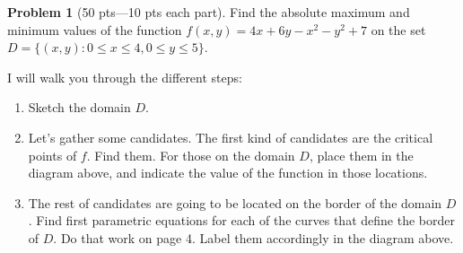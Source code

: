 \documentclass[12pt]{article}
\theoremstyle{definition}
\newtheorem{problem}{Problem}
\begin{document}
\bigskip
\begin{problem}[50 pts---10 pts each part]
Find the absolute maximum and minimum values of the function $f(x,y) = 4x+6y-x^2-y^2+7$ on the set $D = \big\{ (x,y) : 0 \leq x \leq 4, 0 \leq y \leq 5 \big\}$.  

I will walk you through the different steps:
\begin{enumerate}
\item Sketch the domain $D$.

\item Let's gather some candidates.  The first kind of candidates are the critical points of $f$.  Find them.  For those on the domain $D$, place them in the diagram above, and indicate the value of the function in those locations.

\vspace{2cm}
\item The rest of candidates are going to be located on the border of the domain $D$.  Find first parametric equations for each of the curves that define the border of $D$.  Do that work on page 4.  Label them accordingly in the diagram above.


\end{enumerate}
\end{problem}
\end{document}
